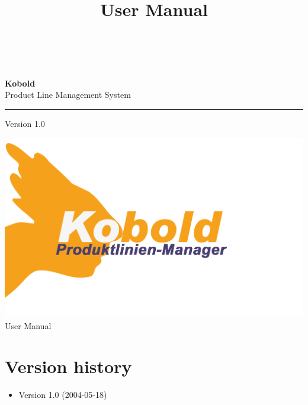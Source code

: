\documentclass[a4paper,titlepage,12pt]{scrbook}
\title {\huge \product\\[0.5cm]\large User Manual \\[0.5cm] \version
  \\[1cm] \Large \company}
\newcommand\version{Version 1.0\xspace}
\begin{document}

\begin{titlepage}
\renewcommand{\thefootnote}{\fnsymbol{footnote}}
{\Huge
\raggedright
\textbf{\bf Kobold} \\
\huge Product Line Management System
\rule{\textwidth}{0.75pt}
\par
}
\begin{flushleft}
\normalsize
\version
\end{flushleft}


\vfill
\includegraphics[width=15cm]{../common/logo-color.png}
\vfill
{\parindent=0cm
\Huge User Manual
}


\setcounter{footnote}{0}
\end{titlepage}


\section*{Version history}

\begin{itemize}

\item Version 1.0 (2004-05-18)

\end{itemize}

\tableofcontents







\end{document}
